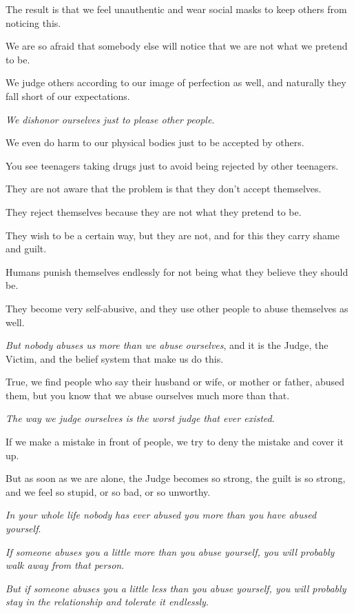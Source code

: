 \documentclass{article}
\numberwithin{equation}{section}
\begin{document}
The result is that we feel unauthentic and wear social masks to keep others from noticing this.

We are so afraid that somebody else will notice that we are not what we pretend to be.

We judge others according to our image of perfection as well, and naturally they fall short of our expectations.

%
\textit{We dishonor ourselves just to please other people}.

We even do harm to our physical bodies just to be accepted by others.

You see teenagers taking drugs just to avoid being rejected by other teenagers.

They are not aware that the problem is that they don't accept themselves.

They reject themselves because they are not what they pretend to be.

They wish to be a certain way, but they are not, and for this they carry shame and guilt.

Humans punish themselves endlessly for not being what they believe they should be.

They become very self-abusive, and they use other people to abuse themselves as well.

%
\textit{But nobody abuses us more than we abuse ourselves}, and it is the Judge, the Victim, and the belief system that make us do this.

True, we find people who say their husband or wife, or mother or father, abused them, but you know that we abuse ourselves much more than that.

\textit{The way we judge ourselves is the worst judge that ever existed}.

If we make a mistake in front of people, we try to deny the mistake and cover it up.

But as soon as we are alone, the Judge becomes so strong, the guilt is so strong, and we feel so stupid, or so bad, or so unworthy.

%
\textit{In your whole life nobody has ever abused you more than you have abused yourself}.


\textit{If someone abuses you a little more than you abuse yourself, you will probably walk away from that person}.

\textit{But if someone abuses you a little less than you abuse yourself, you will probably stay in the relationship and tolerate it endlessly}.
\end{document}
